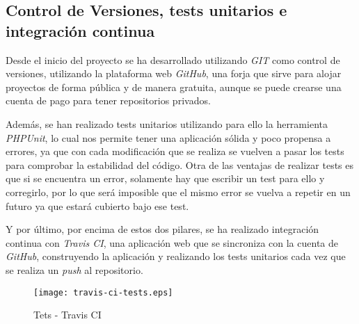 \subsection{Control de Versiones, tests unitarios e integración continua}

Desde el inicio del proyecto se ha desarrollado utilizando \emph{GIT} como control de versiones, utilizando la plataforma web \emph{GitHub}, una forja que sirve para alojar proyectos de forma pública y de manera gratuita, aunque se puede crearse una cuenta de pago para tener repositorios privados.

Además, se han realizado tests unitarios utilizando para ello la herramienta \emph{PHPUnit}, lo cual nos permite tener una aplicación sólida y poco propensa a errores, ya que con cada modificación que se realiza se vuelven a pasar los tests para comprobar la estabilidad del código. Otra de las ventajas de realizar tests es que si se encuentra un error, solamente hay que escribir un test para ello y corregirlo, por lo que será imposible que el mismo error se vuelva a repetir en un futuro ya que estará cubierto bajo ese test.

Y por último, por encima de estos dos pilares, se ha realizado integración continua con \emph{Travis CI}, una aplicación web que se sincroniza con la cuenta de \emph{GitHub}, construyendo la aplicación y realizando los tests unitarios cada vez que se realiza un \emph{push} al repositorio.

\begin{figure}[H]
    \centering
    \texttt{[image: travis-ci-tests.eps]}
    \caption{Tets - Travis CI}\label{fig:travis-ci-tests}
\end{figure}